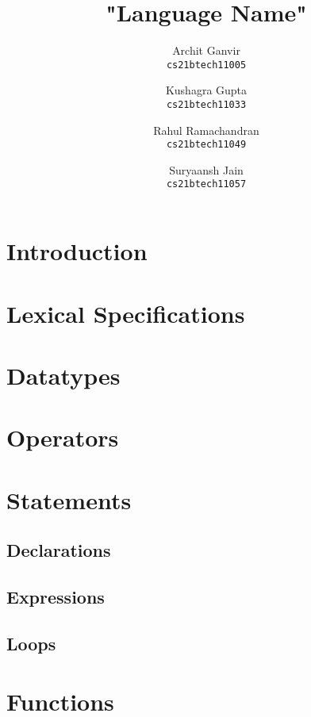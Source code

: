 \documentclass[a4paper, 11pt]{article}
\title{"Language Name"}
\author{
  Archit Ganvir \\
  \texttt{cs21btech11005}
  \and
  Kushagra Gupta \\
  \texttt{cs21btech11033}
  \and
  Rahul Ramachandran\\
  \texttt{cs21btech11049}
  \and
  Suryaansh Jain\\
  \texttt{cs21btech11057}
}
\begin{document}
\maketitle
\tableofcontents

\section{Introduction}

\section{Lexical Specifications}

\section{Datatypes}

\section{Operators}

\section{Statements}
    \subsection{Declarations}
    \subsection{Expressions}
    \subsection{Loops}

\section{Functions}





\end{document}
